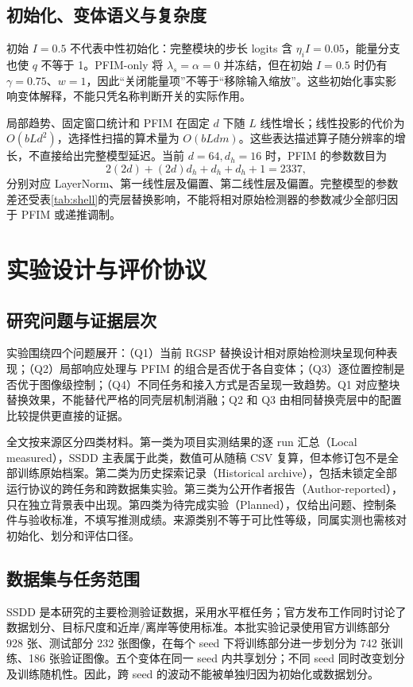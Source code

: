 \documentclass[UTF8,11pt,a4paper,fontset=fandol]{ctexart}
\begin{document}
\subsection{初始化、变体语义与复杂度}
初始 $I=0.5$ 不代表中性初始化：完整模块的步长 logits 含 $\eta_iI=0.05$，能量分支也使 $q$ 不等于 1。PFIM-only 将 $\lambda_s=\alpha=0$ 并冻结，但在初始 $I=0.5$ 时仍有 $\gamma=0.75$、$w=1$，因此“关闭能量项”不等于“移除输入缩放”。这些初始化事实影响变体解释，不能只凭名称判断开关的实际作用。

局部趋势、固定窗口统计和 PFIM 在固定 $d$ 下随 $L$ 线性增长；线性投影的代价为 $O(bLd^2)$，选择性扫描的算术量为 $O(bLdm)$。这些表达描述算子随分辨率的增长，不直接给出完整模型延迟。当前 $d=64,d_h=16$ 时，PFIM 的参数数目为
\begin{equation}
2(2d)+(2d)d_h+d_h+d_h+1=2337,
\end{equation}
分别对应 LayerNorm、第一线性层及偏置、第二线性层及偏置。完整模型的参数差还受表\ref{tab:shell}的壳层替换影响，不能将相对原始检测器的参数减少全部归因于 PFIM 或递推调制。
\FloatBarrier

\section{实验设计与评价协议}\label{sec:experiments}
\subsection{研究问题与证据层次}
实验围绕四个问题展开：（Q1）当前 RGSP 替换设计相对原始检测块呈现何种表现；（Q2）局部响应处理与 PFIM 的组合是否优于各自变体；（Q3）逐位置控制是否优于图像级控制；（Q4）不同任务和接入方式是否呈现一致趋势。Q1 对应整块替换效果，不能替代严格的同壳层机制消融；Q2 和 Q3 由相同替换壳层中的配置比较提供更直接的证据。

全文按来源区分四类材料。第一类为项目实测结果的逐 run 汇总（Local measured），SSDD 主表属于此类，数值可从随稿 CSV 复算，但本修订包不是全部训练原始档案。第二类为历史探索记录（Historical archive），包括未锁定全部运行协议的跨任务和跨数据集实验。第三类为公开作者报告（Author-reported），只在独立背景表中出现。第四类为待完成实验（Planned），仅给出问题、控制条件与验收标准，不填写推测成绩。来源类别不等于可比性等级，同属实测也需核对初始化、划分和评估口径。

\subsection{数据集与任务范围}
SSDD 是本研究的主要检测验证数据，采用水平框任务；官方发布工作同时讨论了数据划分、目标尺度和近岸/离岸等使用标准\cite{ssdd2021}。本批实验记录使用官方训练部分 928 张、测试部分 232 张图像，在每个 seed 下将训练部分进一步划分为 742 张训练、186 张验证图像。五个变体在同一 seed 内共享划分；不同 seed 同时改变划分及训练随机性。因此，跨 seed 的波动不能被单独归因为初始化或数据划分。
\end{document}
